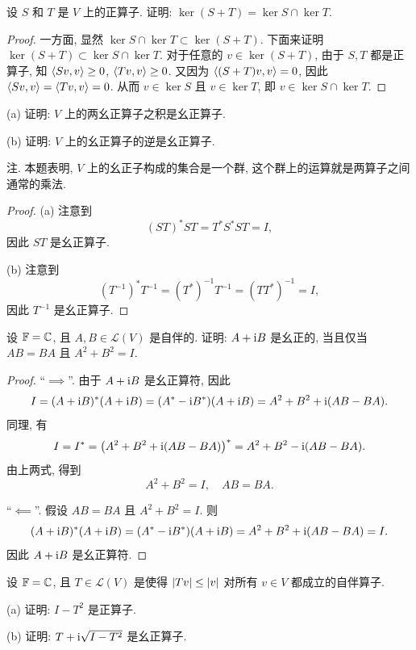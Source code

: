 \documentclass{article}
\begin{document}
\begin{problem}[7C-24]
设 $S$ 和 $T$ 是 $V$ 上的正算子. 证明: $\ker(S + T) = \ker S \cap \ker T$.
\end{problem}

\begin{proof}
  一方面, 显然 \( \ker S \cap\ker T\subset \ker(S+T) \). 下面来证明 \( \ker (S+T)\subset \ker S\cap\ker T \). 对于任意的 \( v\in\ker(S+T) \), 由于 \( S,T \) 都是正算子, 知 \( \left\langle Sv, v \right\rangle\ge 0 \), \( \left\langle Tv, v \right\rangle\ge 0 \). 又因为 \( \left\langle (S+T)v, v \right\rangle=0 \), 因此 \( \left\langle Sv, v \right\rangle=\left\langle Tv, v \right\rangle=0 \). 从而 \( v\in\ker S \) 且 \( v\in\ker T \), 即 \( v\in\ker S \cap\ker T \).
\end{proof}



\begin{problem}[7D-3]
(a) 证明: $V$ 上的两幺正算子之积是幺正算子.

(b) 证明: $V$ 上的幺正算子的逆是幺正算子.

{\heiti 注.} 本题表明, $V$ 上的幺正子构成的集合是一个群, 这个群上的运算就是两算子之间通常的乘法.
\end{problem}

\begin{proof}
  (a) 注意到
  \[ (ST)^*ST=T^*S^*ST=I, \]
  因此 \( ST \) 是幺正算子.\par
  (b) 注意到
  \[ (T^{-1})^*T^{-1}=(T^*)^{-1}T^{-1}=(TT^*)^{-1}=I, \]
  因此 \( T^{-1} \) 是幺正算子.
\end{proof}



\begin{problem}[7D-4]
设 $\mathbb{F} = \mathbb{C}$, 且 $A,B \in \mathcal{L}(V)$ 是自伴的. 证明: $A + \mathrm{i} B$ 是幺正的, 当且仅当 $AB = BA$ 且 $A^2 + B^2 = I$.
\end{problem}

\begin{proof}
  ``\( \implies \)''. 由于 \( A+\mathrm{i} B \) 是幺正算符, 因此
  \[ I=(A+\mathrm{i} B)^*(A+\mathrm{i} B)=(A^*-\mathrm{i} B^*)(A+\mathrm{i} B)=A^2+B^2+\mathrm{i}(AB-BA). \]
  同理, 有
  \[ I=I^*=\left( A^2+B^2+\mathrm{i}(AB-BA) \right)^*=A^2+B^2-\mathrm{i}(AB-BA). \]
  由上两式, 得到
  \[ A^2+B^2=I, \quad AB=BA. \]\par
  ``\( \impliedby \)''. 假设 $AB = BA$ 且 $A^2 + B^2 = I$. 则
  \[ (A+\mathrm{i} B)^*(A+\mathrm{i} B)=(A^*-\mathrm{i} B^*)(A+\mathrm{i} B)=A^2+B^2+\mathrm{i}(AB-BA)=I. \]
  因此 \( A+\mathrm{i} B \) 是幺正算符.
\end{proof}



\begin{problem}[7D-10]
设 $\mathbb{F} = \mathbb{C}$, 且 $T \in \mathcal{L}(V)$ 是使得 $\left|Tv\right| \le \left|v\right|$ 对所有 $v \in V$ 都成立的自伴算子.

(a) 证明: $I - T^2$ 是正算子.

(b) 证明: $T + \mathrm{i}\sqrt{I - T^2}$ 是幺正算子.
\end{problem}
\end{document}
